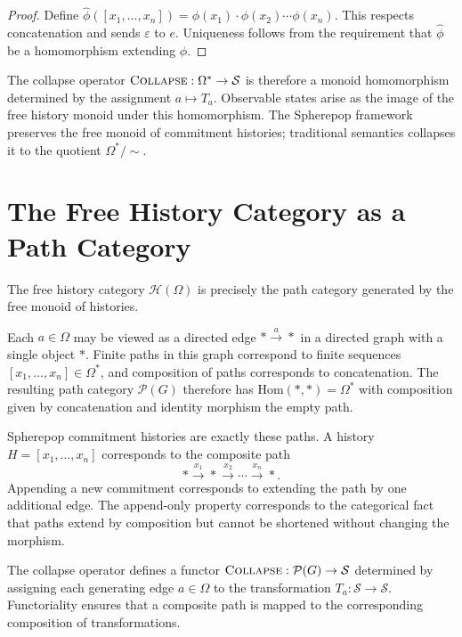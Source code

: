 \documentclass[12pt]{article}
\newcommand{\Collapse}{\operatorname{\textsc{Collapse}}}
\newcommand{\History}{\mathcal{H}}
\newcommand{\Option}{\Omega}
\newcommand{\State}{\mathcal{S}}
\newcommand{\Seq}[1]{\left[#1\right]}
\begin{document}
\begin{proof}
Define $\widehat{\phi}(\Seq{x_1,\dots,x_n}) = \phi(x_1)\cdot\phi(x_2)\cdots\phi(x_n)$. This respects concatenation and sends $\varepsilon$ to $e$. Uniqueness follows from the requirement that $\widehat{\phi}$ be a homomorphism extending $\phi$.
\end{proof}

The collapse operator $\Collapse : \Option^* \to \State$ is therefore a monoid homomorphism determined by the assignment $a \mapsto T_a$. Observable states arise as the image of the free history monoid under this homomorphism. The Spherepop framework preserves the free monoid of commitment histories; traditional semantics collapses it to the quotient $\Option^* / \sim$.

\section{The Free History Category as a Path Category}
\label{app:pathcategory}

The free history category $\History(\Option)$ is precisely the path category generated by the free monoid of histories.

Each $a \in \Option$ may be viewed as a directed edge $\ast \xrightarrow{a} \ast$ in a directed graph with a single object $\ast$. Finite paths in this graph correspond to finite sequences $\Seq{x_1,\dots,x_n} \in \Option^*$, and composition of paths corresponds to concatenation. The resulting path category $\mathcal{P}(G)$ therefore has $\mathrm{Hom}(\ast,\ast) = \Option^*$ with composition given by concatenation and identity morphism the empty path.

Spherepop commitment histories are exactly these paths. A history $H = \Seq{x_1,\dots,x_n}$ corresponds to the composite path
\[
\ast \xrightarrow{x_1} \ast \xrightarrow{x_2} \cdots \xrightarrow{x_n} \ast.
\]
Appending a new commitment corresponds to extending the path by one additional edge. The append-only property corresponds to the categorical fact that paths extend by composition but cannot be shortened without changing the morphism.

The collapse operator defines a functor $\Collapse : \mathcal{P}(G) \to \State$ determined by assigning each generating edge $a \in \Option$ to the transformation $T_a : \State \to \State$. Functoriality ensures that a composite path is mapped to the corresponding composition of transformations.
\end{document}
